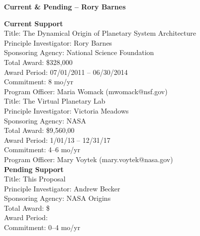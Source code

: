 \documentclass[12pt]{article}
\begin{document}
\begin{center}\Large{\bf Current \& Pending -- Rory Barnes}\end{center}

\noindent\textbf{Current Support}\\

\noindent Title: The Dynamical Origin of Planetary System Architecture\\
Principle Investigator: Rory Barnes\\
Sponsoring Agency: National Science Foundation\\
Total Award: \$328,000\\
Award Period: 07/01/2011 -- 06/30/2014\\
Commitment: 8 mo/yr\\
Program Officer: Maria Womack (mwomack@nsf.gov)\\

\noindent Title: The Virtual Planetary Lab\\
Principle Investigator: Victoria Meadows\\
Sponsoring Agency: NASA\\
Total Award: \$9,560,00\\
Award Period: 1/01/13 -- 12/31/17\\
Commitment: 4--6 mo/yr\\
Program Officer: Mary Voytek (mary.voytek@nasa.gov)\\

\noindent \textbf{Pending Support}\\

\noindent Title: This Proposal\\
Principle Investigator: Andrew Becker\\
Sponsoring Agency: NASA Origins \\
Total Award: \$ \\
Award Period: \\
Commitment: 0--4 mo/yr\\
\end{document}
